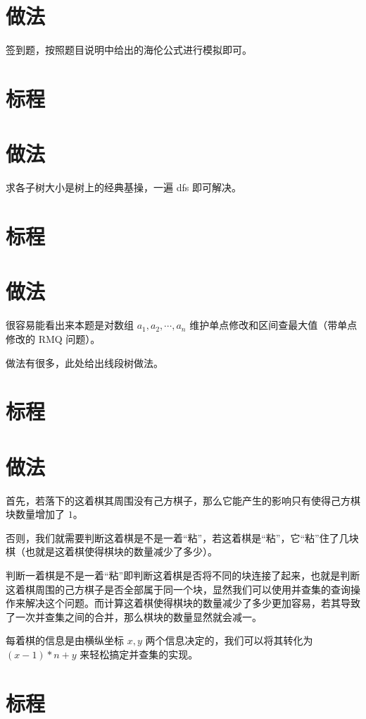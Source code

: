 \documentclass{../cpct/ctsol}
\begin{document}

\makesolution
\section*{做法}

签到题，按照题目说明中给出的海伦公式进行模拟即可。

\section*{标程}


\makesolution
\section*{做法}

求各子树大小是树上的经典基操，一遍 dfs 即可解决。

\section*{标程}


\makesolution
\section*{做法}

很容易能看出来本题是对数组 $a_1,a_2,\cdots,a_n$ 维护单点修改和区间查最大值（带单点修改的 RMQ 问题）。

做法有很多，此处给出线段树做法。

\section*{标程}


\makesolution
\section*{做法}

首先，若落下的这着棋其周围没有己方棋子，那么它能产生的影响只有使得己方棋块数量增加了 $1$。

否则，我们就需要判断这着棋是不是一着“粘”，若这着棋是“粘”，它“粘”住了几块棋（也就是这着棋使得棋块的数量减少了多少）。

判断一着棋是不是一着“粘”即判断这着棋是否将不同的块连接了起来，也就是判断这着棋周围的己方棋子是否全部属于同一个块，显然我们可以使用并查集的查询操作来解决这个问题。而计算这着棋使得棋块的数量减少了多少更加容易，若其导致了一次并查集之间的合并，那么棋块的数量显然就会减一。

每着棋的信息是由横纵坐标 $x,y$ 两个信息决定的，我们可以将其转化为 $(x-1)*n + y$ 来轻松搞定并查集的实现。

\section*{标程}

\end{document}
